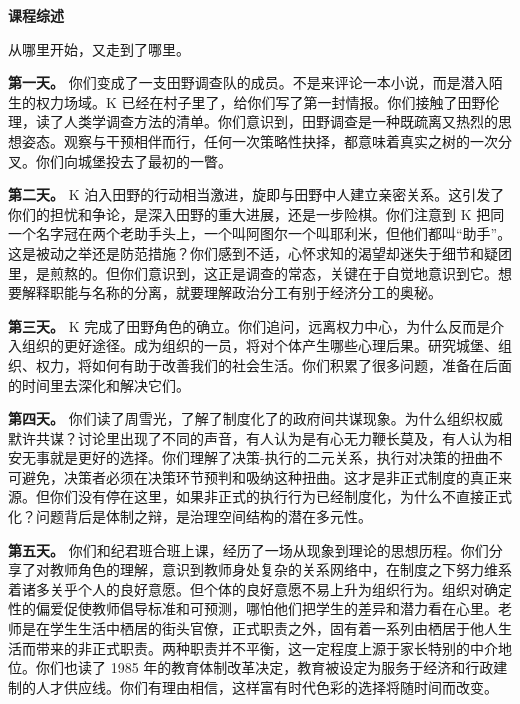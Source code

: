 \documentclass[12pt,a4paper]{article}
\begin{document}
\newpage
\vspace*{1em}
\begin{center}
{\Large\bfseries 课程综述}
\end{center}
\vspace{1em}

从哪里开始，又走到了哪里。



\textbf{第一天。} 你们变成了一支田野调查队的成员。不是来评论一本小说，而是潜入陌生的权力场域。K 已经在村子里了，给你们写了第一封情报。你们接触了田野伦理，读了人类学调查方法的清单。你们意识到，田野调查是一种既疏离又热烈的思想姿态。观察与干预相伴而行，任何一次策略性抉择，都意味着真实之树的一次分叉。你们向城堡投去了最初的一瞥。



\textbf{第二天。} K 泊入田野的行动相当激进，旋即与田野中人建立亲密关系。这引发了你们的担忧和争论，是深入田野的重大进展，还是一步险棋。你们注意到 K 把同一个名字冠在两个老助手头上，一个叫阿图尔一个叫耶利米，但他们都叫“助手”。这是被动之举还是防范措施？你们感到不适，心怀求知的渴望却迷失于细节和疑团里，是煎熬的。但你们意识到，这正是调查的常态，关键在于自觉地意识到它。想要解释职能与名称的分离，就要理解政治分工有别于经济分工的奥秘。



\textbf{第三天。} K 完成了田野角色的确立。你们追问，远离权力中心，为什么反而是介入组织的更好途径。成为组织的一员，将对个体产生哪些心理后果。研究城堡、组织、权力，将如何有助于改善我们的社会生活。你们积累了很多问题，准备在后面的时间里去深化和解决它们。



\textbf{第四天。} 你们读了周雪光，了解了制度化了的政府间共谋现象。为什么组织权威默许共谋？讨论里出现了不同的声音，有人认为是有心无力鞭长莫及，有人认为相安无事就是更好的选择。你们理解了决策-执行的二元关系，执行对决策的扭曲不可避免，决策者必须在决策环节预判和吸纳这种扭曲。这才是非正式制度的真正来源。但你们没有停在这里，如果非正式的执行行为已经制度化，为什么不直接正式化？问题背后是体制之辩，是治理空间结构的潜在多元性。



\textbf{第五天。} 你们和纪君班合班上课，经历了一场从现象到理论的思想历程。你们分享了对教师角色的理解，意识到教师身处复杂的关系网络中，在制度之下努力维系着诸多关乎个人的良好意愿。但个体的良好意愿不易上升为组织行为。组织对确定性的偏爱促使教师倡导标准和可预测，哪怕他们把学生的差异和潜力看在心里。老师是在学生生活中栖居的街头官僚，正式职责之外，固有着一系列由栖居于他人生活而带来的非正式职责。两种职责并不平衡，这一定程度上源于家长特别的中介地位。你们也读了 1985 年的教育体制改革决定，教育被设定为服务于经济和行政建制的人才供应线。你们有理由相信，这样富有时代色彩的选择将随时间而改变。
\end{document}
